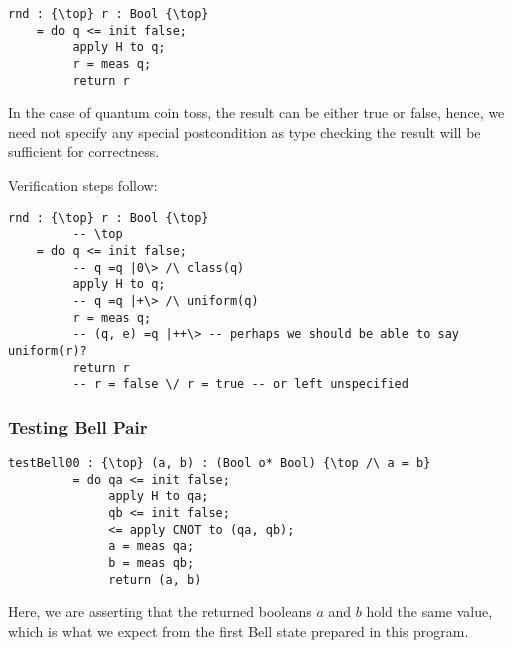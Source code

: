 \documentclass[acmsmall,nonacm,timestamp,review=false,anonymous=false]{acmart}
\begin{document}
\begin{minipage}{0.95\linewidth}
\begin{lstlisting}[language=QHaskell]
rnd : {\top} r : Bool {\top}
    = do q <= init false;
         apply H to q;
         r = meas q;
         return r
\end{lstlisting}
\end{minipage}

In the case of quantum coin toss, the result can be either true or false, hence, we need not specify any special postcondition as type checking the result will be sufficient for correctness.

Verification steps follow:

\begin{minipage}{0.95\linewidth}
\begin{lstlisting}[language=QHaskell]
rnd : {\top} r : Bool {\top}
         -- \top
    = do q <= init false;
         -- q =q |0\> /\ class(q)
         apply H to q;
         -- q =q |+\> /\ uniform(q)
         r = meas q;
         -- (q, e) =q |++\> -- perhaps we should be able to say uniform(r)?
         return r
         -- r = false \/ r = true -- or left unspecified
\end{lstlisting}
\end{minipage}

\subsubsection{Testing Bell Pair}
\leavevmode

\begin{minipage}{0.95\linewidth}
\begin{lstlisting}[language=QHaskell]
testBell00 : {\top} (a, b) : (Bool o* Bool) {\top /\ a = b}
         = do qa <= init false;
              apply H to qa;
              qb <= init false;
              <= apply CNOT to (qa, qb);
              a = meas qa;
              b = meas qb;
              return (a, b)
\end{lstlisting}
\end{minipage}

Here, we are asserting that the returned booleans $a$ and $b$ hold the same value, which is what we expect from the first Bell state prepared in this program.
\end{document}
